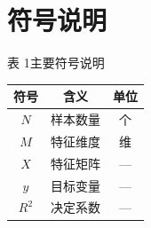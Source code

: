 \section{符号说明}

\newpage
\begin{center}
  {\fontsize{12pt}{14.4pt}\heiti 表 1\quad 主要符号说明}\\[0.6em]
  \begin{tabular}{ccc}
    \toprule
    \textbf{符号} & \textbf{含义} & \textbf{单位} \\
    \midrule
    $N$   & 样本数量 & 个 \\
    $M$   & 特征维度 & 维 \\
    $X$   & 特征矩阵 & --- \\
    $y$   & 目标变量 & --- \\
    $R^2$ & 决定系数 & --- \\
    \bottomrule
  \end{tabular}
\end{center}
